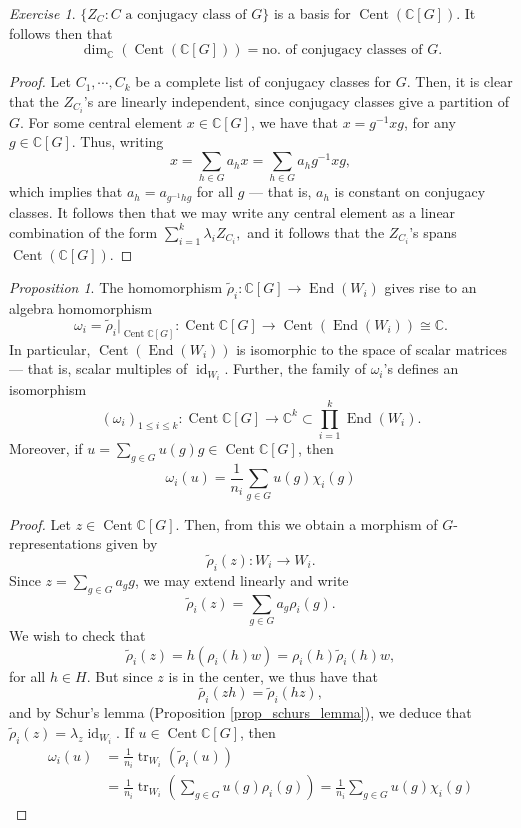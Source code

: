 \documentclass[a4paper]{report}
\theoremstyle{definition}
\theoremstyle{remark}
\theoremstyle{proposition}
\newtheorem{proposition}{Proposition}
\theoremstyle{conjecture}
\theoremstyle{lemma}
\theoremstyle{corollary}
\theoremstyle{exercise}
\newtheorem{exercise}{Exercise}
\theoremstyle{example}
\newcommand{\C}{\mathbb{C}}
\newcommand{\on}{\operatorname}
\begin{document}
\begin{exercise}
    $\lbrace Z_C : \text{$C$ a conjugacy class of $G$}\rbrace$ 
    is a basis for $\on{Cent}(\C[G])$.
    It follows then that 
    $$\dim_\C(\on{Cent}(\C[G])) = \text{no. of conjugacy classes of $G$}.$$
\end{exercise}

\begin{proof}
    Let $C_1,\cdots,C_k$ be a complete list of conjugacy classes for $G$.
    Then, it is clear that the $Z_{C_i}$'s are linearly independent,
    since conjugacy classes give a partition of $G$.
    For some central element $x\in \C[G]$, we have that 
    $x = g^{-1}xg$, for any $g\in \C[G]$. Thus, writing 
    $$x = \sum_{h\in G} a_h x = \sum_{h\in G} a_h g^{-1}xg,$$
    which implies that $a_h = a_{g^{-1}hg}$ for all $g$ --- 
    that is, $a_h$ is constant on conjugacy classes.
    It follows then that we may write any central element as 
    a linear combination of the form $\sum_{i=1}^k \lambda_iZ_{C_i},$
    and it follows that the $Z_{C_i}$'s spans $\on{Cent}(\C[G])$.
\end{proof}

\begin{proposition}\label{prop_prop6}
    The homomorphism $\widetilde{\rho}_i : \C[G] \to \on{End}(W_i)$
    gives rise to an algebra homomorphism 
    $$\omega_i = \widetilde{\rho}_i\vert_{\on{Cent}\C[G]} : \on{Cent}\C[G]\longrightarrow \on{Cent}(\on{End}(W_i)) \cong \C.$$
    In particular, $\on{Cent}(\on{End}(W_i))$ is isomorphic to the space 
    of scalar matrices --- that is, scalar multiples of $\on{id}_{W_i}$.
    Further, the family of $\omega_i$'s defines an isomorphism 
    $$(\omega_i)_{1\leq i \leq k} : \on{Cent}\C[G] \longrightarrow \C^k \subset \prod_{i=1}^k \on{End}(W_i).$$
    Moreover, if $u = \sum_{g \in G} u(g)g \in \on{Cent}\C[G]$, then
    $$\omega_i(u) = \frac{1}{n_i}\sum_{g\in G}u(g)\chi_i(g)$$
\end{proposition}

\begin{proof}
    Let $z \in \on{Cent}\C[G]$. Then, from this we obtain a morphism of 
    $G$-representations given by 
    $$\widetilde{\rho}_i(z) : W_i \longrightarrow W_i.$$
    Since $z = \sum_{g \in G} a_gg$, we may extend linearly and write 
    $$\widetilde{\rho}_i(z) = \sum_{g \in G}a_g \rho_i(g).$$
    We wish to check that $$\widetilde{\rho}_i(z) = h(\rho_i(h) w) = \rho_i(h)\widetilde{\rho}_i(h)w,$$
    for all $h \in H$. But since $z$ is in the center, we thus have that 
    $$\widetilde{\rho_i}(zh) = \widetilde{\rho}_i(hz),$$
    and by Schur's lemma (Proposition \ref{prop_schurs_lemma}), 
    we deduce that $\widetilde{\rho}_i(z) = \lambda_z\on{id}_{W_i}$.
    If $u\in \on{Cent}\C[G]$, then 
    \begin{align*}
        \omega_i(u) &= \frac{1}{n_i} \on{tr}_{W_i}(\widetilde{\rho}_i(u))\\ 
                    &= \frac{1}{n_i} \on{tr}_{W_i}\left(\sum_{g\in G}u(g)\rho_i(g)\right)= \frac{1}{n_i}\sum_{g \in G}u(g)\chi_i(g)
    \end{align*}
\end{proof}
\end{document}

